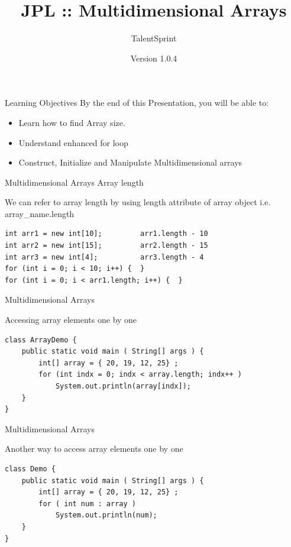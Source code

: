 \documentclass[14pt]{beamer}
\title[JPL:Java:02]{JPL :: Multidimensional Arrays}
\author[TS]{TalentSprint}
\institute[L\&D]{Licensed To Skill}
\date{Version 1.0.4}
\begin{document}
\begin{frame}
  \titlepage
\end{frame}

\begin{frame}{Learning Objectives}
By the end of this Presentation, you will be able to:
\begin{itemize}
\item Learn how to find Array size.
\item Understand enhanced for loop
\item Construct, Initialize and Manipulate Multidimensional  arrays
\end{itemize}
\end{frame}

\begin{frame}[fragile]{Multidimensional Arrays}
Array length

We can refer to array length by using length attribute of array object i.e. array\_name.length
\begin{lstlisting}[numbers=none]
int arr1 = new int[10];			arr1.length - 10 
int arr2 = new int[15];			arr2.length - 15 
int arr3 = new int[4];			arr3.length - 4 
for (int i = 0; i < 10; i++) {  } 
for (int i = 0; i < arr1.length; i++) {  }
\end{lstlisting}
\end{frame}

\begin{frame}[fragile]{Multidimensional Arrays}
\begin{block}{Accessing array elements one by one}
\begin{lstlisting}[numbers=none]
class ArrayDemo { 
    public static void main ( String[] args ) { 
        int[] array = { 20, 19, 12, 25} ; 
        for (int indx = 0; indx < array.length; indx++ )
            System.out.println(array[indx]);
    } 
} 
\end{lstlisting}
\end{block}
\end{frame}

\begin{frame}[fragile]{Multidimensional Arrays}
\begin{block}{Another way to access array elements one by one}
\begin{lstlisting}[numbers=none]
class Demo { 
    public static void main ( String[] args ) { 
        int[] array = { 20, 19, 12, 25} ; 
        for ( int num : array )
            System.out.println(num);
    } 
} 
\end{lstlisting}
\end{block}
\end{frame}
\end{document}

